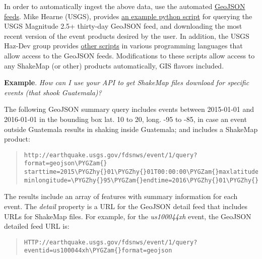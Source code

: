 \documentclass[letterpaper,10pt,english]{sphinxmanual}
\def\PYGZam{\char`\&}
\def\PYGZhy{\char`\-}
\begin{document}
In order to automatically ingest the above data, use the automated
\href{http://earthquake.usgs.gov/earthquakes/feed/v1.0/geojson.php}{GeoJSON feeds}.
Mike Hearne (USGS), provides \href{https://gist.github.com/mhearne-usgs/6b040c0b423b7d03f4b9}{an example python script} for querying the USGS
Magnitude 2.5+ thirty-day GeoJSON feed, and downloading the most recent version of
the event products desired by the user. In addition, the USGS Haz-Dev group provides
\href{https://github.com/usgs/devcorner}{other scripts} in various programming languages
that allow access to the GeoJSON feeds. Modifications to these scripts allow
access to any ShakeMap (or other) products automatically, GIS flavors included.

\textbf{Example}. \emph{How can I use your API to get ShakeMap files download for specific events (that shook Guatemala)?}

The following GeoJSON summary query includes events between 2015-01-01
and 2016-01-01 in the bounding box lat. 10 to 20, long. -95 to -85,
in case an event outside Guatemala results in shaking inside
Guatemala; and includes a ShakeMap product:
\begin{quote}

\begin{Verbatim}[commandchars=\\\{\}]
http://earthquake.usgs.gov/fdsnws/event/1/query?format=geojson\PYGZam{}
starttime=2015\PYGZhy{}01\PYGZhy{}01T00:00:00\PYGZam{}maxlatitude=20\PYGZam{}minlatitude=10\PYGZam{}maxlongitude=\PYGZhy{}85\PYGZam{}
minlongitude=\PYGZhy{}95\PYGZam{}endtime=2016\PYGZhy{}01\PYGZhy{}01T00:00:00\PYGZam{}producttype=shakemap
\end{Verbatim}
\end{quote}

The results include an array of features with summary information for
each event.  The \emph{detail} property is a URL for the GeoJSON detail
feed that includes URLs for ShakeMap files. For example, for the
\emph{us100044xh} event, the GeoJSON detailed feed URL is:
\begin{quote}

\begin{Verbatim}[commandchars=\\\{\}]
HTTP://earthquake.usgs.gov/fdsnws/event/1/query?eventid=us100044xh\PYGZam{}format=geojson
\end{Verbatim}
\end{quote}
\end{document}
